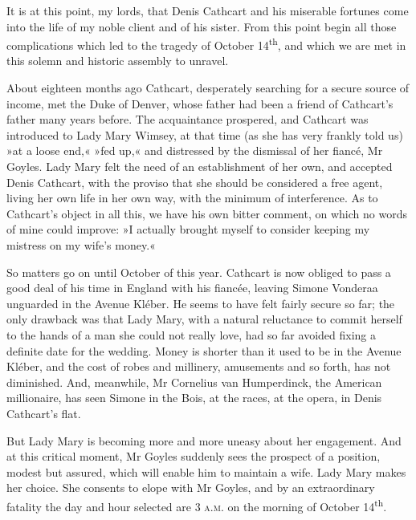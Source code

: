 \begin{dialogue}
\smallskip 

It is at this point, my lords, that Denis Cathcart and his miserable fortunes come into the life of my noble client and of his sister. From this point begin all those complications which led to the tragedy of October 14\textsuperscript{th}, and which we are met in this solemn and historic assembly to unravel.

\smallskip 

About eighteen months ago Cathcart, desperately searching for a secure source of income, met the Duke of Denver, whose father had been a friend of Cathcart's father many years before. The acquaintance prospered, and Cathcart was introduced to Lady Mary Wimsey, at that time (as she has very frankly told us) »at a loose end,« »fed up,« and distressed by the dismissal of her fiancé, Mr Goyles. Lady Mary felt the need of an establishment of her own, and accepted Denis Cathcart, with the proviso that she should be considered a free agent, living her own life in her own way, with the minimum of interference. As to Cathcart's object in all this, we have his own bitter comment, on which no words of mine could improve: »I actually brought myself to consider keeping my mistress on my wife's money.«

\smallskip 

So matters go on until October of this year. Cathcart is now obliged to pass a good deal of his time in England with his fiancée, leaving Simone Vonderaa unguarded in the Avenue Kléber. He seems to have felt fairly secure so far; the only drawback was that Lady Mary, with a natural reluctance to commit herself to the hands of a man she could not really love, had so far avoided fixing a definite date for the wedding. Money is shorter than it used to be in the Avenue Kléber, and the cost of robes and millinery, amusements and so forth, has not diminished. And, meanwhile, Mr Cornelius van Humperdinck, the American millionaire, has seen Simone in the Bois, at the races, at the opera, in Denis Cathcart's flat.

\smallskip 

But Lady Mary is becoming more and more uneasy about her engagement. And at this critical moment, Mr Goyles suddenly sees the prospect of a position, modest but assured, which will enable him to maintain a wife. Lady Mary makes her choice. She consents to elope with Mr Goyles, and by an extraordinary fatality the day and hour selected are 3 \textsc{a.m.} on the morning of October 14\textsuperscript{th}.


\end{dialogue}
